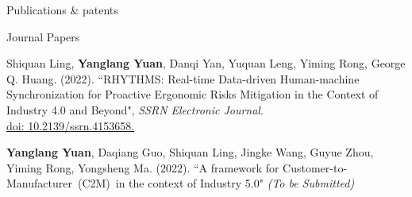 \documentclass{resume} %
\begin{document}
\begin{rSection}{Publications \& patents}

    \begin{rSubsection}{Journal Papers}{}{}{}

        \item Shiquan Ling,{ \textbf{Yanglang Yuan}, Danqi Yan, Yuquan Leng, Yiming Rong, George Q. Huang. (2022). “RHYTHMS: Real-time Data-driven Human-machine Synchronization for Proactive Ergonomic Risks Mitigation in the Context of Industry 4.0 and Beyond", \textit{SSRN Electronic Journal}}.\\
        \href{http://dx.doi.org/10.2139/ssrn.4153658}{{doi: 10.2139/ssrn.4153658.}}

        \item {\textbf{Yanglang Yuan}, Daqiang Guo, Shiquan Ling, Jingke Wang, Guyue Zhou, Yiming Rong, Yongsheng Ma. (2022). “A framework for Customer-to-Manufacturer~(C2M)~in the context of Industry 5.0"} \textit{(To be Submitted)}

        \vspace{-5pt}    
    \end{rSubsection}





\end{rSection}
\end{document}
